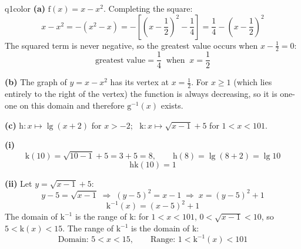 \documentclass[11pt,a4paper]{article}
\begin{document}
\begin{ansbox}{q1color}
\textbf{(a)} $\mathrm{f}(x)=x-x^2$. Completing the square:
\[ x-x^2=-\left(x^2-x\right)=-\left[\left(x-\frac{1}{2}\right)^2-\frac{1}{4}\right]=\frac{1}{4}-\left(x-\frac{1}{2}\right)^2 \]
The squared term is never negative, so the greatest value occurs when $x-\frac{1}{2}=0$:
\[ \boxed{\text{greatest value}=\frac{1}{4}\ \text{ when }\ x=\frac{1}{2}} \]

\textbf{(b)} The graph of $y=x-x^2$ has its vertex at $x=\frac{1}{2}$. For $x\geqslant1$ (which lies entirely to the right of the vertex) the function is always decreasing, so it is one-one on this domain and therefore $\mathrm{g}^{-1}(x)$ exists.

\textbf{(c)} $\mathrm{h}:x\mapsto\lg(x+2)$ for $x>-2$; \ $\mathrm{k}:x\mapsto\sqrt{x-1}+5$ for $1<x<101$.

\textbf{(i)}
\[ \mathrm{k}(10)=\sqrt{10-1}+5=3+5=8, \qquad \mathrm{h}(8)=\lg(8+2)=\lg10 \]
\[ \boxed{\mathrm{hk}(10)=1} \]

\textbf{(ii)} Let $y=\sqrt{x-1}+5$:
\[ y-5=\sqrt{x-1} \;\Rightarrow\; (y-5)^2=x-1 \;\Rightarrow\; x=(y-5)^2+1 \]
\[ \boxed{\mathrm{k}^{-1}(x)=(x-5)^2+1} \]
The domain of $\mathrm{k}^{-1}$ is the range of $\mathrm{k}$: for $1<x<101$, $0<\sqrt{x-1}<10$, so $5<\mathrm{k}(x)<15$. The range of $\mathrm{k}^{-1}$ is the domain of $\mathrm{k}$:
\[ \boxed{\text{Domain: } 5<x<15, \qquad \text{Range: } 1<\mathrm{k}^{-1}(x)<101} \]
\end{ansbox}
\end{document}
